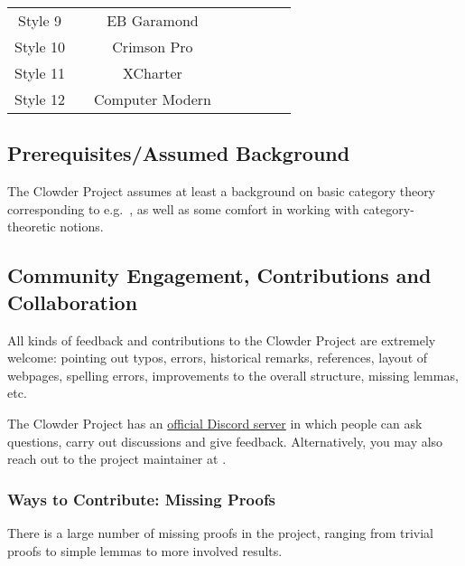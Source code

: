 \begin{center}
\begin{tabular}{|Sc|Sc|Sc|Sc|}
        Style 9                           &                        & EB Garamond                          &                                    \\
        Style 10                          &                        & Crimson Pro                          &                                    \\
        Style 11                          &                        & XCharter                             &                                    \\
        Style 12                          &                        & Computer Modern                      &                                    \\\hline
    \end{tabular}
\end{center}
\endgroup
\subsection{Prerequisites/Assumed Background}\label{subsection-prerequisites-assumed-background}
The Clowder Project assumes at least a background on basic category theory corresponding to e.g.\ \cite{category-theory-in-context}, as well as some comfort in working with category-theoretic notions.
\subsection{Community Engagement, Contributions and Collaboration}\label{subsection-community-engagement-contributions-and-collaboration}
All kinds of feedback and contributions to the Clowder Project are extremely welcome: pointing out typos, errors, historical remarks, references, layout of webpages, spelling errors, improvements to the overall structure, missing lemmas, etc.

The Clowder Project has an \href{https://discord.gg/b98uG2MWgc}{official Discord server} in which people can ask questions, carry out discussions and give feedback. Alternatively, you may also reach out to the project maintainer at \href{mailto:emily.de.oliveira.santos.tmf@gmail.com}{}.
\subsubsection{Ways to Contribute: Missing Proofs}\label{subsubsection-ways-to-contribute-missing-proofs}
There is a large number of missing proofs in the project, ranging from trivial proofs to simple lemmas to more involved results.

